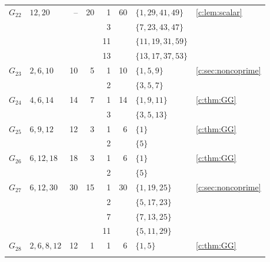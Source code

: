 \documentclass[11pt]{amsart}
\theoremstyle{definition}
\begin{document}
\begin{longtable}{@{}lL{.24\textwidth}rrrrL{.26\textwidth}L{.14\textwidth}@{}}
\midrule[.25pt]
$G_{22}$ & $12,\allowbreak 20$ & -- & 20 & 1 & 60 & $\{1,\allowbreak 29,\allowbreak 41,\allowbreak 49\}$ & \cref{c:lem:scalar} \\*
 &  &  &  & 3 &  & $\{7,\allowbreak 23,\allowbreak 43,\allowbreak 47\}$ &  \\*
 &  &  &  & 11 &  & $\{11,\allowbreak 19,\allowbreak 31,\allowbreak 59\}$ &  \\*
 &  &  &  & 13 &  & $\{13,\allowbreak 17,\allowbreak 37,\allowbreak 53\}$ &  \\
\midrule[.25pt]
$G_{23}$ & $2,\allowbreak 6,\allowbreak 10$ & 10 & 5 & 1 & 10 & $\{1,\allowbreak 5,\allowbreak 9\}$ & \cref{c:sec:noncoprime} \\*
 &  &  &  & 2 &  & $\{3,\allowbreak 5,\allowbreak 7\}$ &  \\
\midrule[.25pt]
$G_{24}$ & $4,\allowbreak 6,\allowbreak 14$ & 14 & 7 & 1 & 14 & $\{1,\allowbreak 9,\allowbreak 11\}$ & \cref{c:thm:GG} \\*
 &  &  &  & 3 &  & $\{3,\allowbreak 5,\allowbreak 13\}$ &  \\
\midrule[.25pt]
$G_{25}$ & $6,\allowbreak 9,\allowbreak 12$ & 12 & 3 & 1 & 6 & $\{1\}$ & \cref{c:thm:GG} \\*
 &  &  &  & 2 &  & $\{5\}$ &  \\
\midrule[.25pt]
$G_{26}$ & $6,\allowbreak 12,\allowbreak 18$ & 18 & 3 & 1 & 6 & $\{1\}$ & \cref{c:thm:GG} \\*
 &  &  &  & 2 &  & $\{5\}$ &  \\
\midrule[.25pt]
$G_{27}$ & $6,\allowbreak 12,\allowbreak 30$ & 30 & 15 & 1 & 30 & $\{1,\allowbreak 19,\allowbreak 25\}$ & \cref{c:sec:noncoprime} \\*
 &  &  &  & 2 &  & $\{5,\allowbreak 17,\allowbreak 23\}$ &  \\*
 &  &  &  & 7 &  & $\{7,\allowbreak 13,\allowbreak 25\}$ &  \\*
 &  &  &  & 11 &  & $\{5,\allowbreak 11,\allowbreak 29\}$ &  \\
\midrule[.25pt]
$G_{28}$ & $2,\allowbreak 6,\allowbreak 8,\allowbreak 12$ & 12 & 1 & 1 & 6 & $\{1,\allowbreak 5\}$ & \cref{c:thm:GG} \\
\midrule[.25pt]

\end{longtable}
\end{document}
